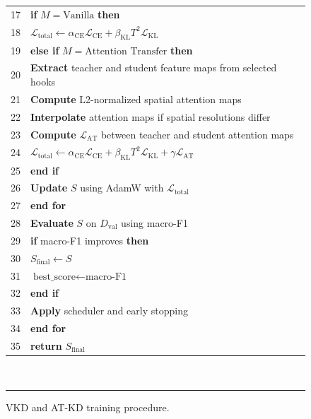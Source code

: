 \documentclass[preprint,review,12pt]{elsarticle}
\begin{document}
\begin{figure}[tbp]
\begin{tabular}{@{}r@{\ \ }p{}@{}}
17 & \hspace{3em}\textbf{if} $M = \text{Vanilla}$ \textbf{then} \\
18 & \hspace{4.5em}$\mathcal{L}_{\text{total}} \leftarrow \alpha_{\text{CE}}\mathcal{L}_{\text{CE}} + \beta_{\text{KL}}T^{2}\mathcal{L}_{\text{KL}}$ \\
19 & \hspace{3em}\textbf{else if} $M = \text{Attention Transfer}$ \textbf{then} \\
20 & \hspace{4.5em}\textbf{Extract} teacher and student feature maps from selected hooks \\
21 & \hspace{4.5em}\textbf{Compute} L2-normalized spatial attention maps \\
22 & \hspace{4.5em}\textbf{Interpolate} attention maps if spatial resolutions differ \\
23 & \hspace{4.5em}\textbf{Compute} $\mathcal{L}_{\text{AT}}$ between teacher and student attention maps \\
24 & \hspace{4.5em}$\mathcal{L}_{\text{total}} \leftarrow \alpha_{\text{CE}}\mathcal{L}_{\text{CE}} + \beta_{\text{KL}}T^{2}\mathcal{L}_{\text{KL}} + \gamma\mathcal{L}_{\text{AT}}$ \\
25 & \hspace{3em}\textbf{end if} \\
26 & \hspace{3em}\textbf{Update} $S$ using AdamW with $\mathcal{L}_{\text{total}}$ \\
27 & \hspace{1.5em}\textbf{end for} \\
28 & \hspace{1.5em}\textbf{Evaluate} $S$ on $D_{\text{val}}$ using macro-F1 \\
29 & \hspace{1.5em}\textbf{if} macro-F1 improves \textbf{then} \\
30 & \hspace{3em}$S_{\text{final}} \leftarrow S$ \\
31 & \hspace{3em}$\text{best\_score} \leftarrow \text{macro-F1}$ \\
32 & \hspace{1.5em}\textbf{end if} \\
33 & \hspace{1.5em}\textbf{Apply} scheduler and early stopping \\
34 & \textbf{end for} \\
35 & \textbf{return} $S_{\text{final}}$ \\
\end{tabular}\\[1pt]
\rule{\columnwidth}{0.9pt}
\caption{VKD and AT-KD training procedure.}
\label{alg:training}
\end{figure}
\end{document}
